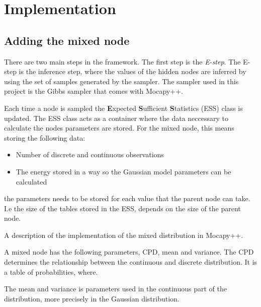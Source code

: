 \documentclass[10pt, conference, compsocconf,a4paper]{IEEEtran}
\begin{document}



\section{Implementation} %
\label{sec:implementation}

\subsection{Adding the mixed node} %
\label{sub:adding_the_mixed_node}


There are two main steps in the framework. The first step is the \emph{E-step}. The E-step is the inference step, where the values of the hidden nodes are inferred by using the set of samples generated by the sampler. The sampler used in this project is the Gibbs sampler that comes with Mocapy++.

Each time a node is sampled the \textbf{E}xpected \textbf{S}ufficient \textbf{S}tatistics (ESS) class is updated. The ESS class acts as a container where the data neccessary to calculate the nodes parameters are stored. For the mixed node, this means storing the following data:

\begin{itemize}
  \item Number of discrete and continuous observations
  \item The energy stored in a way so the Gaussian model parameters can be calculated
\end{itemize}
the parameters needs to be stored for each value that the parent node can take. I.e the size of the tables stored in the ESS, depends on the size of the parent node.

A description of the implementation of the mixed distribution in Mocapy++. 

A mixed node has the following parameters, CPD, mean and variance. The CPD determines the relationship between the continuous and discrete distribution. It is a table of probabilities, where.

The mean and variance is parameters used in the continuous part of the distribution, more precisely in the Gaussian distribution. 
                                                                                                                                  
\end{document}
